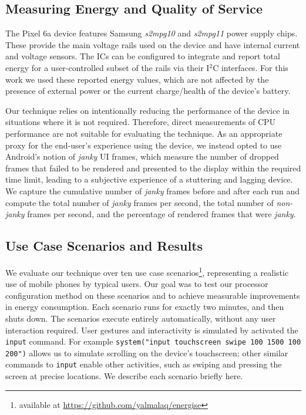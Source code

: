 \documentclass[conference]{IEEEtran}
\begin{document}
\subsection{Measuring Energy and Quality of Service} \label{sec:measureeneryqos}


The Pixel 6a device features Samsung \emph{s2mpg10} and \emph{s2mpg11} power supply chips. These provide the main voltage rails used on the device and have internal current and voltage sensors. The ICs can be configured to integrate and report total energy for a user-controlled subset of the rails via their I$^2$C interfaces. For this work we used these reported energy values, which are not affected by the presence of external power or the current charge/health of the device's battery.

Our technique relies on intentionally reducing the performance of the device in situations where it is not required. Therefore, direct measurements of CPU performance are not suitable for evaluating the technique. As an appropriate proxy for the end-user's experience using the device, we instead opted to use Android's notion of \emph{janky} UI frames, which measure the number of dropped frames that failed to be rendered and presented to the display within the required time limit, leading to a subjective experience of a stuttering and lagging device. We capture the cumulative number of \emph{janky} frames before and after each run and compute the total number of \emph{janky} frames per second, the total number of \emph{non-janky} frames per second, and the percentage of rendered frames that were \emph{janky}.

\subsection{Use Case Scenarios and Results} \label{sec:scenarios}
We evaluate our technique over ten use case scenarios\footnote{available at \url{https://github.com/yalmalaq/energise}}, representing a realistic use of mobile phones by typical users. Our goal was to test our processor configuration method on these scenarios and to achieve measurable improvements in energy consumption. Each scenario runs for exactly two minutes, and then shuts down. The scenarios execute entirely automatically, without any user interaction required. User gestures and interactivity is simulated by activated the \texttt{input} command. For example \texttt{system("input touchscreen swipe 100 1500 100 200")} allows us to simulate scrolling on the device's touchscreen; other similar commands to \texttt{input} enable other activities, such as swiping and pressing the screen at precise locations. 
We describe each scenario briefly here.
\end{document}
